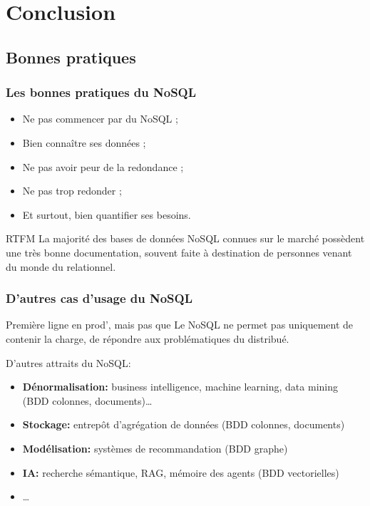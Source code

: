 \section{Conclusion}

    \subsection{Bonnes pratiques}
        \begin{frame}
            \frametitle{Les bonnes pratiques du NoSQL}

            \begin{itemize}
                \item Ne pas commencer par du NoSQL ;
                \item Bien connaître ses données ;
                \item Ne pas avoir peur de la redondance ;
                \item Ne pas trop redonder ;
                \item Et surtout, bien quantifier ses besoins.
            \end{itemize}


            \begin{block}{RTFM}
                La majorité des bases de données NoSQL connues sur le marché possèdent une très bonne documentation, souvent faite à destination de personnes venant du monde du relationnel.
            \end{block}
        \end{frame}

        \begin{frame}
            \frametitle{D'autres cas d'usage du NoSQL}
            \begin{alertblock}{Première ligne en prod', mais pas que}
                Le NoSQL ne permet pas uniquement de contenir la charge, de répondre aux problématiques du distribué.
            \end{alertblock}

            \vspace{10px}

            D'autres attraits du NoSQL:
            \begin{itemize}
                \item \textbf{Dénormalisation:} business intelligence, machine learning, data mining (BDD colonnes, documents)\dots
                \item \textbf{Stockage:} entrepôt d’agrégation de données (BDD colonnes, documents)
                \item \textbf{Modélisation:} systèmes de recommandation (BDD graphe)
                \item \textbf{IA:} recherche sémantique, RAG, mémoire des agents (BDD vectorielles)
                \item \dots
            \end{itemize}
        \end{frame}

